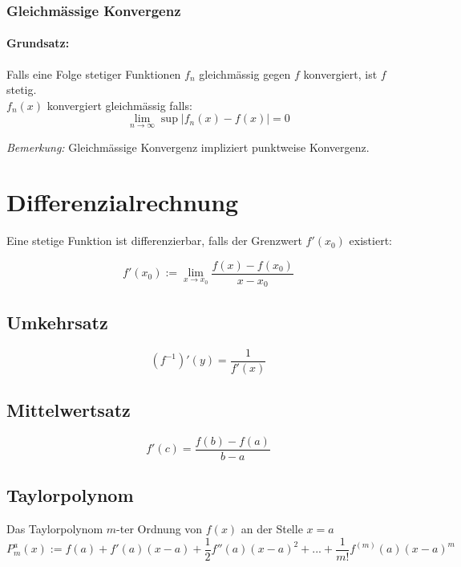 \documentclass[11pt]{article}
\begin{document}
\subsubsection*{Gleichmässige Konvergenz}

\paragraph{Grundsatz:} Falls eine Folge stetiger Funktionen $f_n$ gleichmässig gegen $f$ konvergiert, ist $f$ stetig.\\

$f_n(x)$ konvergiert gleichmässig falls:
\begin{equation*}
	\lim_{n\rightarrow\infty} \sup|f_n(x) - f(x)| = 0
\end{equation*}

\emph{Bemerkung:} Gleichmässige Konvergenz impliziert punktweise Konvergenz.

\section{Differenzialrechnung}

Eine stetige Funktion ist differenzierbar, falls der Grenzwert $f'(x_0)$ existiert:

\begin{equation*}
	f'(x_0) := \lim_{x\to x_0}\frac{f(x) - f(x_0)}{x-x_0}
\end{equation*}

\subsection{Umkehrsatz}

\begin{equation*}
	(f^{-1})'(y) = \frac{1}{f'(x)}
\end{equation*}

\subsection{Mittelwertsatz}

\begin{equation*}
	f'(c) = \frac{f(b) - f(a)}{b - a}
\end{equation*}

\subsection{Taylorpolynom}

Das Taylorpolynom $m$-ter Ordnung von $f(x)$ an der Stelle $x=a$
\begin{equation*}
	P^a_m(x) := f(a) + f'(a)(x-a) + \frac{1}{2}f''(a)(x-a)^2 + ... + \frac{1}{m!} f^{(m)}(a)(x-a)^m
\end{equation*}
\end{document}
